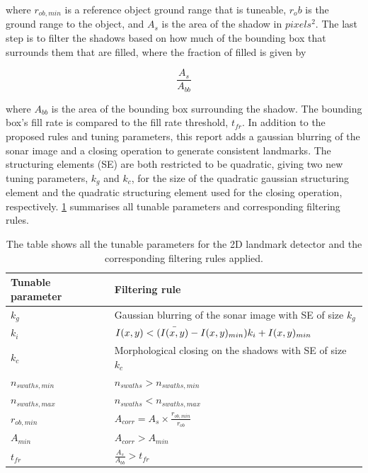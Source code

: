 where $r_{ob, min}$ is a reference object ground range that is tuneable, $r_ob$ is the ground range to the object, and $A_s$ is the area of the shadow in $pixels^2$. The last step is to filter the shadows based on how much of the bounding box that surrounds them that are filled, where the fraction of filled is given by

\begin{equation}
    \frac{A_s}{A_{bb}}
    \label{eq:fill_rate_bb}
\end{equation}

where $A_{bb}$ is the area of the bounding box surrounding the shadow. The bounding box's fill rate is compared to the fill rate threshold, $t_{fr}$. In addition to the proposed rules and tuning parameters, this report adds a gaussian blurring of the sonar image and a closing operation to generate consistent landmarks. The structuring elements (SE) are both restricted to be quadratic, giving two new tuning parameters, $k_g$ and $k_c$, for the size of the quadratic gaussian structuring element and the quadratic structuring element used for the closing operation, respectively. \cref{tab:2D_tuning_rules} summarises all tunable parameters and corresponding filtering rules. 

\begin{table}
    \begin{center}
    \begin{tabular}{|l|l|}
    \hline
        \textbf{Tunable parameter} & \textbf{Filtering rule}                            \\ \hline
        $k_g$             & Gaussian blurring of the sonar image with SE of size $k_g$  \\ \hline
        $k_i$             & $I(x,y) < (\Bar{I(x,y)} - I(x,y)_{min}) k_i + I(x,y)_{min}$ \\ \hline
        $k_c$             & Morphological closing on the shadows with SE of size $k_c$  \\ \hline
        $n_{swaths,min}$  & $n_{swaths} > n_{swaths,min}$                               \\ \hline
        $n_{swaths,max}$  & $n_{swaths} < n_{swaths,max}$                               \\ \hline
        $r_{ob,min}$      & $A_{corr} = A_s \times \frac{r_{ob,min}}{r_{ob}}$           \\ \hline
        $A_{min}$         & $A_{corr} > A_{min}$                                        \\ \hline
        $t_{fr}$          & $\frac{A_s}{A_{bb}} > t_{fr}$                               \\ \hline
    \end{tabular}
    \end{center}
    \caption{The table shows all the tunable parameters for the 2D landmark detector and the corresponding filtering rules applied.}
    \label{tab:2D_tuning_rules}
\end{table}

